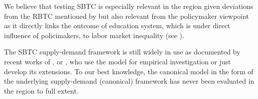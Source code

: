 \documentclass[11pt]{article}
\begin{document}
We believe that testing SBTC is especially relevant in the region given deviations from the RBTC mentioned by \cite{arendt2019technical, hardy2018educational} but also relevant from the policymaker viewpoint as it directly links the outcome of education system, which is under direct influence of policimakers, to labor market inequality (see \citep{goldin2010race}). 

The SBTC supply-demand framework is still widely in use as documented by recent works of \cite{glitz2021skill}, \cite{aziz2021between} or \cite{farber2021unions}, who use the model for empirical investigation or just develop its extensions. To our best knowledge, the canonical model in the form of the underlying supply-demand (canonical) framework has never been evaluated in the region to full extent.





\end{document}

